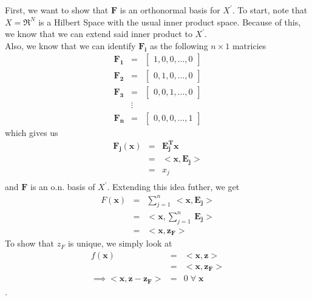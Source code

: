 \documentclass[11pt]{SelfArxOneColBMN}
\begin{document}
\begin{solution}
  First, we want to show that $\mathbf{F}$ is an orthonormal basis for $X^\prime$. To start, note that $X = \Re^N$ is a Hilbert Space with the usual inner product space. Because of this, we know that we can extend said inner product to $X^\prime$.\\
  Also, we know that we can identify $\mathbf{F_i}$ as the following $n\times1$ matricies
  \begin{eqnarray*}
    \mathbf{F_1} &=&
    \begin{bmatrix}
      1,0,0,\hdots,0
    \end{bmatrix}
    \\
    \mathbf{F_2} &=&
    \begin{bmatrix}
      0,1,0,\hdots,0
    \end{bmatrix}
    \\
    \mathbf{F_3} &=&
    \begin{bmatrix}
      0,0,1,\hdots,0
    \end{bmatrix}
    \\
    &\vdots&\\
    \mathbf{F_n} &=&
    \begin{bmatrix}
      0,0,0,\hdots,1
    \end{bmatrix}
  \end{eqnarray*}
  which gives us 
  \begin{eqnarray*}
    \mathbf{F_j}(\mathbf{x}) &=& \mathbf{E_j^T}\mathbf{x}\\
    &=& <\mathbf{x},\mathbf{E_j}>\\
    &=& x_j\\
  \end{eqnarray*}
  and $\mathbf{F}$ is an o.n. basis of $X^\prime$. Extending this idea futher, we get
  \begin{eqnarray*}
    F(\mathbf{x}) &=& \sum_{j=1}^n\:<\mathbf{x},\mathbf{E_j}>\\
    &=& <\mathbf{x},\sum_{j=1}^n\:\mathbf{E_j}>\\
    &=& <\mathbf{x},\mathbf{z_F}>
  \end{eqnarray*}
  To show that $z_F$ is unique, we simply look at
  \begin{eqnarray*}
    f(\mathbf{x}) &=& <\mathbf{x},\mathbf{z}>\\
    &=& <\mathbf{x},\mathbf{z_F}>\\
    \implies <\mathbf{x},\mathbf{z} - \mathbf{z_F}> &=& 0 \; \forall \; \mathbf{x}
  \end{eqnarray*}.

\end{solution}
\end{document}
